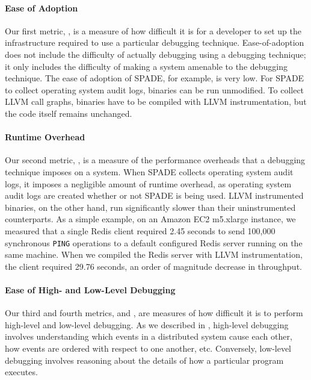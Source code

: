 \paragraph{Ease of Adoption}
Our first metric, , is a measure of how difficult it
is for a developer to set up the infrastructure required to use a particular
debugging technique. Ease-of-adoption does not include the difficulty of
actually debugging using a debugging technique; it only includes the difficulty
of making a system amenable to the debugging technique.
%
The ease of adoption of SPADE, for example, is very low. For SPADE to collect
operating system audit logs, binaries can be run unmodified. To collect LLVM
call graphs, binaries have to be compiled with LLVM instrumentation, but the
code itself remains unchanged.

\paragraph{Runtime Overhead}
Our second metric, , is a measure of the performance
overheads that a debugging technique imposes on a system.
%
When SPADE collects operating system audit logs, it imposes a negligible amount
of runtime overhead, as operating system audit logs are created whether or not
SPADE is being used. LLVM instrumented binaries, on the other hand, run
significantly slower than their uninstrumented counterparts. As a simple
example, on an Amazon EC2 m5.xlarge instance, we measured that a single Redis
client required 2.45 seconds to send 100,000 synchronous \texttt{PING}
operations to a default configured Redis server running on the same machine.
When we compiled the Redis server with LLVM instrumentation, the client
required 29.76 seconds, an order of magnitude decrease in throughput.

\paragraph{Ease of High- and Low-Level Debugging}
Our third and fourth metrics,  and
, are measures of how difficult it is to
perform high-level and low-level debugging. As we described in
, high-level debugging involves understanding which
events in a distributed system cause each other, how events are ordered with
respect to one another, etc. Conversely, low-level debugging involves reasoning
about the details of how a particular program executes.

